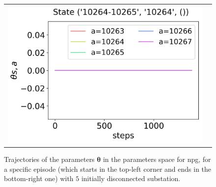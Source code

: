 \begin{figure}[!htp]
\begin{tabular}{cc}
        \hspace*{-28pt}\includegraphics[scale=0.36,valign=b]{chapters/figures/theta_NPG_state_3.png}
    \end{tabular}
    \caption{Trajectories of the parameters $\boldsymbol \theta$ in the parameters space for \acrshort{npg}, for a specific episode (which starts in the top-left corner and ends in the bottom-right one) with $5$ initially disconnected substation.}
    \label{fig:sequence-theta-npg}
\end{figure}


